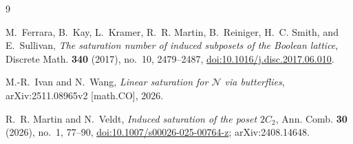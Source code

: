 \documentclass[11pt]{amsart}
\begin{document}
\begin{thebibliography}{9}

M.~Ferrara, B.~Kay, L.~Kramer, R.~R. Martin, B.~Reiniger, H.~C. Smith,
and E.~Sullivan,
\emph{The saturation number of induced subposets of the Boolean lattice},
Discrete Math. \textbf{340} (2017), no.~10, 2479--2487,
\href{https://doi.org/10.1016/j.disc.2017.06.010}
{doi:10.1016/j.disc.2017.06.010}.

M.-R.~Ivan and N.~Wang,
\emph{Linear saturation for $\mathcal N$ via butterflies},
arXiv:2511.08965v2 [math.CO], 2026.

R.~R. Martin and N.~Veldt,
\emph{Induced saturation of the poset $2C_2$},
Ann. Comb. \textbf{30} (2026), no.~1, 77--90,
\href{https://doi.org/10.1007/s00026-025-00764-z}
{doi:10.1007/s00026-025-00764-z}; arXiv:2408.14648.

\end{thebibliography}
\end{document}
